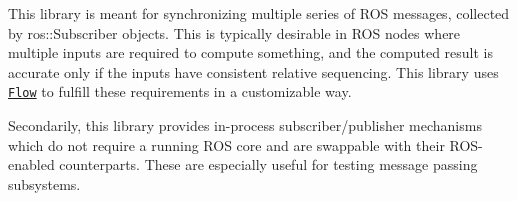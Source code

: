 This library is meant for synchronizing multiple series of R\+OS messages, collected by {\ttfamily ros\+::\+Subscriber} objects. This is typically desirable in R\+OS nodes where multiple inputs are required to compute something, and the computed result is accurate only if the inputs have consistent relative sequencing. This library uses \href{https://github.com/fetchrobotics/flow}{\tt Flow} to fulfill these requirements in a customizable way.

Secondarily, this library provides in-\/process subscriber/publisher mechanisms which do not require a running R\+OS core and are swappable with their R\+O\+S-\/enabled counterparts. These are especially useful for testing message passing subsystems. 